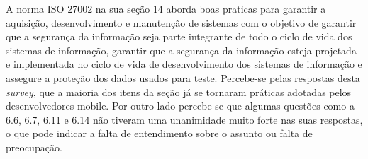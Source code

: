 A norma ISO 27002 na sua seção 14 aborda boas praticas para garantir a aquisição, desenvolvimento e manutenção de sistemas com o objetivo de garantir que a segurança da informação seja parte integrante de todo o ciclo de vida dos sistemas de informação, garantir que a segurança da informação esteja projetada e implementada no ciclo de vida de desenvolvimento dos sistemas de informação e assegure a proteção dos dados usados para teste. Percebe-se pelas respostas desta \textit{survey}, que a maioria dos itens da seção já se tornaram práticas adotadas pelos desenvolvedores mobile. Por outro lado percebe-se que algumas questões como a 6.6, 6.7, 6.11 e 6.14 não tiveram uma unanimidade muito forte nas suas respostas, o que pode indicar a falta de entendimento sobre o assunto ou falta de preocupação.


 



